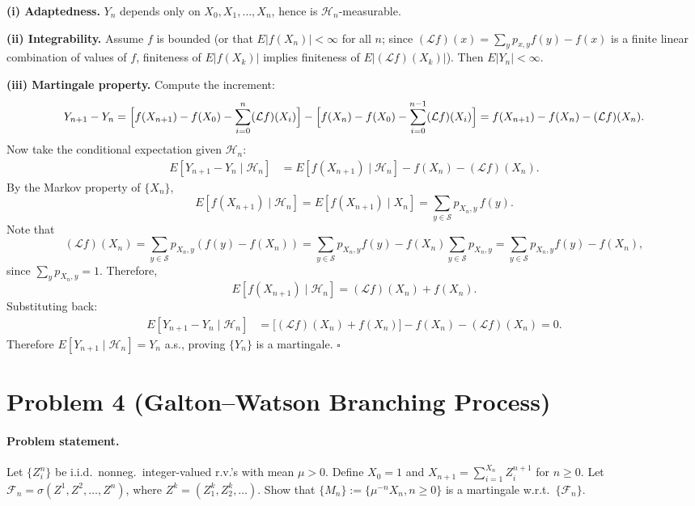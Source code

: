 \documentclass[11pt]{article}
\newcommand{\1}{\mathbf{1}}
\theoremstyle{plain}
\begin{document}
\textbf{(i) Adaptedness.}
$Y_n$ depends only on $X_0,X_1,\ldots,X_n$, hence is $\mathcal{H}_n$-measurable.

\textbf{(ii) Integrability.}
Assume $f$ is bounded (or that $E|f(X_n)|<\infty$ for all $n$; since $(\mathcal{L}f)(x)
=\sum_y p_{x,y}f(y)-f(x)$ is a finite linear combination of values of $f$, finiteness
of $E|f(X_k)|$ implies finiteness of $E|(\mathcal{L}f)(X_k)|$). Then $E|Y_n|<\infty$.

\textbf{(iii) Martingale property.}
Compute the increment:
\[
  Y_{n+1} - Y_n
  = \Bigl[f(X_{n+1})-f(X_0)-\sum_{i=0}^{n}(\mathcal{L}f)(X_i)\Bigr]
    - \Bigl[f(X_n)-f(X_0)-\sum_{i=0}^{n-1}(\mathcal{L}f)(X_i)\Bigr]
  = f(X_{n+1}) - f(X_n) - (\mathcal{L}f)(X_n).
\]
Now take the conditional expectation given $\mathcal{H}_n$:
\begin{align*}
  E[Y_{n+1}-Y_n\mid\mathcal{H}_n]
  &= E[f(X_{n+1})\mid\mathcal{H}_n] - f(X_n) - (\mathcal{L}f)(X_n).
\end{align*}
By the Markov property of $\{X_n\}$,
\[
  E[f(X_{n+1})\mid\mathcal{H}_n]
  = E[f(X_{n+1})\mid X_n]
  = \sum_{y\in\mathcal{S}}p_{X_n,y}\,f(y).
\]
Note that
\[
  (\mathcal{L}f)(X_n)
  = \sum_{y\in\mathcal{S}}p_{X_n,y}(f(y)-f(X_n))
  = \sum_{y\in\mathcal{S}}p_{X_n,y}f(y) - f(X_n)\sum_{y\in\mathcal{S}}p_{X_n,y}
  = \sum_{y\in\mathcal{S}}p_{X_n,y}f(y) - f(X_n),
\]
since $\sum_y p_{X_n,y}=1$. Therefore,
\[
  E[f(X_{n+1})\mid\mathcal{H}_n] = (\mathcal{L}f)(X_n) + f(X_n).
\]
Substituting back:
\begin{align*}
  E[Y_{n+1}-Y_n\mid\mathcal{H}_n]
  &= \bigl[(\mathcal{L}f)(X_n)+f(X_n)\bigr] - f(X_n) - (\mathcal{L}f)(X_n)
   = 0.
\end{align*}
Therefore $E[Y_{n+1}\mid\mathcal{H}_n]=Y_n$ a.s., proving $\{Y_n\}$ is a
martingale. $\square$

\section*{Problem 4 (Galton--Watson Branching Process)}

\paragraph{Problem statement.}
Let $\{Z_i^n\}$ be i.i.d.\ nonneg.\ integer-valued r.v.'s with mean $\mu>0$.
Define $X_0=1$ and $X_{n+1}=\sum_{i=1}^{X_n}Z_i^{n+1}$ for $n\ge0$.
Let $\mathcal{F}_n=\sigma(Z^1,Z^2,\ldots,Z^n)$, where $Z^k=(Z_1^k,Z_2^k,\ldots)$.
Show that $\{M_n\}:=\{\mu^{-n}X_n, n\ge0\}$ is a martingale w.r.t.\ $\{\mathcal{F}_n\}$.
\end{document}
